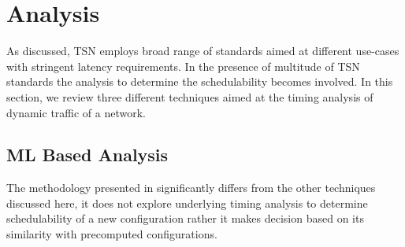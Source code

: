 \documentclass[journal,12pt,twocolumn]{IEEEtran}
\begin{document}
%
%

\section {Analysis}
As discussed, TSN employs broad range of standards aimed at different use-cases with stringent latency requirements. In the presence of multitude of TSN standards the analysis to determine the schedulability becomes involved. In this section, we review three different techniques aimed at the timing analysis of dynamic traffic of a network.

\subsection {ML Based Analysis}
The methodology presented in \cite{ML} significantly differs from the other techniques discussed here, it does not explore underlying timing analysis to determine schedulability of a new configuration rather it makes decision based on its similarity with precomputed configurations.
\end{document}
